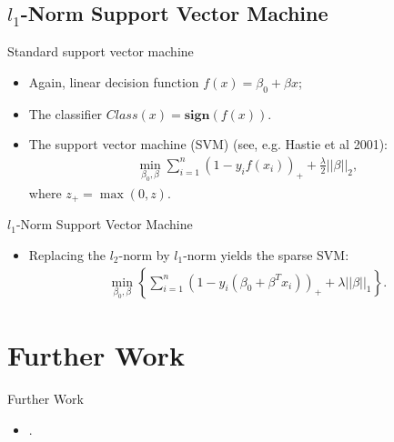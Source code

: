 \documentclass[12pt, trans]{beamer}
\newcommand{\1}[1]{{\mathbf 1}\left\{#1\right\}}        %
\begin{document}
\subsection{$l_1$-Norm Support Vector Machine}
\begin{frame}[fragile]{Standard support vector machine}

\begin{itemize}[<+->]
\item Again, linear decision function $f(x) = \beta_0 + \beta x$;
\item The classifier $Class(x) = \textbf{sign} (f(x))$. 
\item  The support vector machine (SVM) (see, e.g. Hastie et al 2001): 
\begin{align*}
\min_{\beta_0,\beta} \sum_{i=1}^n(1-y_if(x_i))_+ + \frac{\lambda}{2} ||\beta||_2,
\end{align*}
where $z_+ = \max(0,z)$. 
\end{itemize}

\end{frame}


\begin{frame}[fragile]{$l_1$-Norm Support Vector Machine}

\begin{itemize}[<+->]  
\item Replacing the $l_2$-norm by $l_1$-norm yields the sparse SVM:
\begin{align*}
\min_{\beta_0,\beta} \left\{ \sum_{i=1}^n(1-y_i(\beta_0+\beta^Tx_i))_+ + \lambda ||\beta||_1\right\}. 
\end{align*}
\end{itemize}

\end{frame}


\section{Further Work}

\begin{frame}{Further Work}

\begin{itemize}[<+->]
\item .
\end{itemize}

\end{frame}
\end{document}

